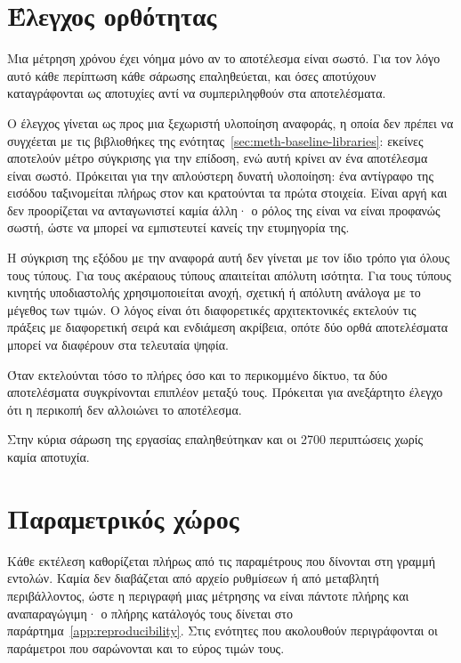 \section{Έλεγχος ορθότητας}
\label{sec:meth-correctness}

Μια μέτρηση χρόνου έχει νόημα μόνο αν το αποτέλεσμα είναι σωστό. Για τον λόγο
αυτό κάθε περίπτωση κάθε σάρωσης επαληθεύεται, και όσες αποτύχουν καταγράφονται
ως αποτυχίες αντί να συμπεριληφθούν στα αποτελέσματα.

Ο έλεγχος γίνεται ως προς μια ξεχωριστή υλοποίηση αναφοράς, η οποία δεν πρέπει
να συγχέεται με τις βιβλιοθήκες της ενότητας~\ref{sec:meth-baseline-libraries}:
εκείνες αποτελούν μέτρο σύγκρισης για την επίδοση, ενώ αυτή κρίνει αν ένα
αποτέλεσμα είναι σωστό. Πρόκειται για την απλούστερη δυνατή υλοποίηση: ένα
αντίγραφο της εισόδου ταξινομείται πλήρως στον  και κρατούνται τα πρώτα
 στοιχεία. Είναι αργή και δεν προορίζεται να ανταγωνιστεί καμία άλλη· ο
ρόλος της είναι να είναι προφανώς σωστή, ώστε να μπορεί να εμπιστευτεί κανείς
την ετυμηγορία της.

Η σύγκριση της εξόδου με την αναφορά αυτή δεν γίνεται με τον ίδιο τρόπο για
όλους τους τύπους. Για τους ακέραιους τύπους απαιτείται απόλυτη ισότητα. Για τους τύπους κινητής υποδιαστολής χρησιμοποιείται ανοχή,
σχετική ή απόλυτη ανάλογα με το μέγεθος των τιμών. Ο λόγος είναι ότι
διαφορετικές αρχιτεκτονικές εκτελούν τις πράξεις με διαφορετική σειρά και
ενδιάμεση ακρίβεια, οπότε δύο ορθά αποτελέσματα μπορεί να διαφέρουν στα
τελευταία ψηφία.

Όταν εκτελούνται τόσο το πλήρες όσο και το περικομμένο δίκτυο, τα δύο
αποτελέσματα συγκρίνονται επιπλέον μεταξύ τους. Πρόκειται για ανεξάρτητο έλεγχο
ότι η περικοπή δεν αλλοιώνει το αποτέλεσμα.

Στην κύρια σάρωση της εργασίας επαληθεύτηκαν και οι 2700 περιπτώσεις χωρίς καμία
αποτυχία.

\section{Παραμετρικός χώρος}
\label{sec:meth-parameters}

Κάθε εκτέλεση καθορίζεται πλήρως από τις παραμέτρους που δίνονται στη γραμμή
εντολών. Καμία δεν διαβάζεται από αρχείο ρυθμίσεων ή από μεταβλητή
περιβάλλοντος, ώστε η περιγραφή μιας μέτρησης να είναι πάντοτε πλήρης και
αναπαραγώγιμη· ο πλήρης κατάλογός τους δίνεται στο
παράρτημα~\ref{app:reproducibility}. Στις ενότητες που ακολουθούν περιγράφονται
οι παράμετροι που σαρώνονται και το εύρος τιμών τους.

